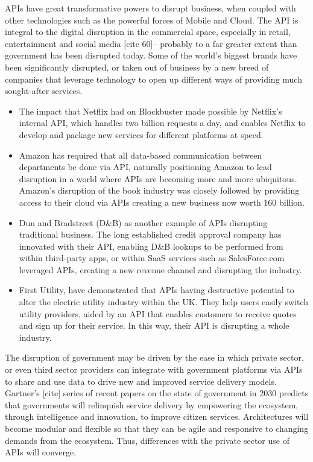 APIs have great transformative powers to disrupt business, when coupled
with other technologies such as the powerful forces of Mobile and Cloud.
The API is integral to the digital disruption in the commercial space,
especially in retail, entertainment and social media [cite 60]– probably
to a far greater extent than government has been disrupted today. Some
of the world’s biggest brands have been significantly disrupted, or taken
out of business by a new breed of companies that leverage technology to
open up different ways of providing much sought-after services.
\begin{itemize}
	\item The impact that Netflix had on Blockbuster made possible by
	Netflix’s internal API, which handles two billion requests a day,
	and enables Netflix to develop and package new services for different
	platforms at speed.
	
	\item Amazon has required that all data-based communication between
	departments be done via API, naturally positioning Amazon to lead
	disruption in a world where APIs are becoming more and more ubiquitous.
	Amazon’s disruption of the book industry was closely followed by providing
	access to their cloud via APIs creating a new business now worth 160 billion.
	
	\item Dun and Bradstreet (D\&B) as another example of APIs disrupting
	traditional business. The long established credit approval company has
	innovated with their API, enabling D\&B lookups to be performed from
	within third-party apps, or within SaaS services such as SalesForce.com
	leveraged APIs, creating a new revenue channel and disrupting the industry.
	
	\item First Utility, have demonstrated that APIs having destructive
	potential to alter the electric utility	industry within the UK. They
	help users easily switch utility providers, aided by an API that enables
	customers to receive quotes and sign up for their service. In this way,
	their API is disrupting a whole industry.
\end{itemize}

The disruption of government may be driven by the ease in which private sector,
or even third sector providers can integrate with government platforms via APIs
to share and use data to drive new and improved service delivery models.
Gartner’s [cite] series of recent papers on the state of government in 2030 predicts
that governments will relinquish service delivery by empowering the ecosystem,
through intelligence and innovation, to improve citizen services. Architectures
will become modular and flexible so that they can be agile and responsive to
changing demands from the ecosystem. Thus, differences with the private sector
use of APIs will converge.

